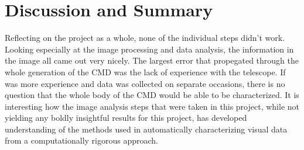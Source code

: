 \documentclass[twoside,11pt]{article}
\begin{document}
\section{Discussion and Summary}
Reflecting on the project as a whole, none of the individual steps didn't work. Looking especially at the image processing and data analysis, the information in the image all came out very nicely. The largest error that propegated through the whole generation of the CMD was the lack of experience with the telescope. If was more experience and data was collected on separate occasions, there is no question that the whole body of the CMD would be able to be characterized. It is interesting how the image analysis steps that were taken in this project, while not yielding any boldly insightful results for this project, has developed understanding of the methods used in automatically characterizing visual data from a computationally rigorous approach. \citep{prometheus} \citep{bozepy}


\vskip 0.2in

\end{document}
